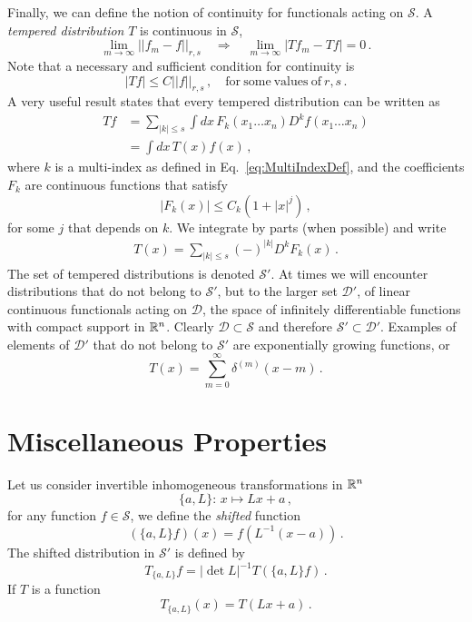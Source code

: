 Finally, we can define the notion of continuity for functionals acting on
$\mathcal{S}$. A {\em tempered distribution} $T$ is continuous in $\mathcal{S}$,
\ie
\[
    \lim_{m\to\infty} ||f_m - f||_{r,s} \quad
    \Longrightarrow \quad
    \lim_{m\to\infty} |Tf_m - Tf| = 0\, .
\]
Note that a necessary and sufficient condition for continuity is 
\[
    |Tf| \leq C ||f||_{r,s}\, , 
    \quad \mathrm{for\ some\ values\ of}\ r,s\, .    
\]
A very useful result states that every tempered distribution can be written as
\begin{align}
    \label{eq:TempConv}
    Tf 
        &= \sum_{|k|\leq s} \int dx\, 
            F_k(x_1 \ldots x_n) D^k f(x_1 \ldots x_n) \\
        &= \int dx\, T(x) f(x)\, ,
\end{align}
where $k$ is a multi-index as defined in Eq.~\eqref{eq:MultiIndexDef}, and the
coefficients $F_k$ are continuous functions that satisfy
\begin{equation}
    \label{eq:FkBound}
    \left|F_k(x)\right| \leq C_k \left(1 + |x|^j\right)\, ,
\end{equation}
for some $j$ that depends on $k$. We integrate by parts (when possible) and
write
\begin{align}
    \label{eq:TempKernel}
    T(x) = \sum_{|k|\leq s} (-)^{|k|} D^k F_k(x)\, .
\end{align}
The set of tempered distributions is denoted $\mathcal{S}'$. At times we will
encounter distributions that do not belong to $\mathcal{S}'$, but to the larger
set $\mathcal{D}'$, of linear continuous functionals acting on $\mathcal{D}$,
the space of infinitely differentiable functions with compact support in $\mathbb{R}^n$.
Clearly $\mathcal{D}\subset\mathcal{S}$ and therefore $\mathcal{S}' \subset
\mathcal{D}'$. Examples of elements of $\mathcal{D}'$ that do not belong to
$\mathcal{S}'$ are exponentially growing functions, or 
\[
    T(x) = \sum_{m=0}^\infty \delta^{(m)}(x-m)\, .   
\]

\section{Miscellaneous Properties}
\label{sec:MiscProp}

Let us consider invertible inhomogeneous transformations in $\mathbb{R}^n$
\begin{equation}
    \label{eq:RnInhomogeneous}
    \{a, L\}:\, x \mapsto L x + a\, ,
\end{equation}
for any function $f\in\mathcal{S}$, we define the {\em shifted} function
\begin{equation}
    \label{eq:ShiftedFun}
    \left(\{a,L\} f\right)(x) = 
        f\left(L^{-1}(x-a)\right)\, .
\end{equation}
The shifted distribution in $\mathcal{S}'$ is defined by
\begin{equation}
    \label{eq:ShiftedDistr}
    T_{\{a,L\}} f = \left|\det L\right|^{-1} 
        T\left(\{a,L\}f\right)\, .
\end{equation}
If $T$ is a function
\begin{equation}
    \label{eq:ShiftedDistrFun}
    T_{\{a,L\}}(x) = T(Lx+a)\, .
\end{equation}

